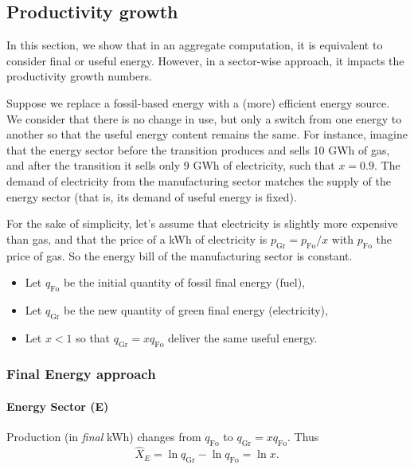 \documentclass[11pt]{article}
\begin{document}
\subsection{Productivity growth}

In this section, we show that in an aggregate computation, it is equivalent to consider final or useful energy. However, in a sector-wise approach, it impacts the productivity growth numbers. 

\vspace{3mm}

Suppose we replace a fossil-based energy with a (more) efficient energy source. We consider that there is no change in use, but only a switch from one energy to another so that the useful energy content remains the same. For instance, imagine that the energy sector before the transition produces and sells 10 GWh of gas, and after the transition it sells only 9 GWh of electricity, such that $x=0.9$. The demand of electricity from the manufacturing sector matches the supply of the energy sector (that is, its demand of useful energy is fixed).
  
For the sake of simplicity, let's assume that electricity is slightly more expensive than gas, and that the price of a kWh of electricity is $p_{\mathrm{Gr}}=p_{\mathrm{Fo}}/x$ with $p_{\mathrm{Fo}}$ the price of gas. So the energy bill of the manufacturing sector is constant.

\begin{itemize}
    \item Let $q_{\mathrm{Fo}}$ be the initial quantity of fossil final energy (fuel), 
    \item Let $q_{\mathrm{Gr}}$ be the new quantity of green final energy (electricity),
    \item Let $x < 1$ so that $q_{\mathrm{Gr}} = xq_{\mathrm{Fo}}$ deliver the same useful energy.
\end{itemize}


\subsubsection{Final Energy approach}


\paragraph{Energy Sector (E)}
 
Production (in \emph{final} kWh) changes from $q_{\mathrm{Fo}}$ to $q_{\mathrm{Gr}} = xq_{\mathrm{Fo}}$.  Thus
\begin{equation*}
    \hat{X}_E = \ln q_{\mathrm{Gr}} - \ln q_{\mathrm{Fo}}
                     = \ln x.
\end{equation*}
\end{document}
